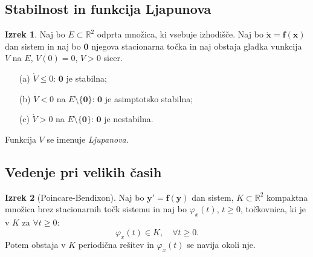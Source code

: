 \documentclass[11pt]{article}
\newcommand{\R}{\mathbb{R}}
\newcommand{\f}{\mathbf{f}}
\newcommand{\x}{\mathbf{x}}
\newcommand{\y}{\mathbf{y}}
\newcommand{\set}[1]{\{#1\}}
\newcommand{\0}{\mathbf{0}}
\theoremstyle{definition}
\theoremstyle{definition}
\theoremstyle{definition}
\newtheorem{izrek}{Izrek}[section]
\theoremstyle{definition}
\begin{document}

\subsection{Stabilnost in funkcija Ljapunova}
\vspace{0.5cm}

\begin{izrek}

Naj bo $E \subset \R^2$ odprta množica, ki vsebuje izhodišče. Naj bo $\dot{\x}=\f(\x)$ dan sistem in naj bo $\0$ njegova stacionarna točka in naj obstaja gladka vunkcija $V$ na $E$, $V(0)=0$, $V>0$ sicer.
\begin{enumerate}
	\item[(a)] $\dot{V} \leq 0$: $\0$ je stabilna;
	\item[(b)] $\dot{V}<0$ na $E \setminus \set{\0}$: $\0$ je asimptotsko stabilna;
	\item[(c)] $\dot{V}>0$ na $E \setminus \set{\0}$: $\0$ je nestabilna. 
\end{enumerate}
Funkcija $V$ se imenuje \textit{Ljupanova}.

\end{izrek}
\vspace{0.5cm}


\subsection{Vedenje pri velikih časih}
\vspace{0.5cm}

\begin{izrek}[Poincare-Bendixon]

Naj bo $\y' = \f(\y)$ dan sistem, $K \subset \R^2$ kompaktna množica brez stacionarnih točk sistemu in naj bo $\varphi_x(t)$, $t \geq 0$, točkovnica, ki je v $K$ za $\forall t \geq 0$:
$$\varphi_x(t) \in K, \quad \forall t \geq 0.$$
Potem obstaja v $K$ periodična rešitev in $\varphi_x(t)$ se navija okoli nje.

\end{izrek}
\vspace{0.5cm}


\pagebreak

\end{document}
